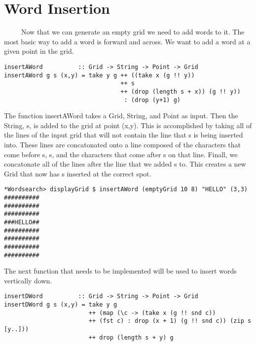 \documentclass[12pt]{report}   %
\begin{document}
\section*{Word Insertion}
    \ \ \ \ \ Now that we can generate an empty grid we need to add words to
    it. The most basic way to add a word is forward and across. We want to add
    a word at a given point in the grid.

    \vspace{12pt}

    \begin{lstlisting}
insertAWord          :: Grid -> String -> Point -> Grid
insertAWord g s (x,y) = take y g ++ ((take x (g !! y)) 
                                 ++ s 
                                 ++ (drop (length s + x)) (g !! y)) 
                                  : (drop (y+1) g)
    \end{lstlisting}

    \vspace{12pt}

    The function insertAWord takes a Grid, String, and Point as input. Then the
    String, s, is added to the grid at point (x,y). This is accomplished by
    taking all of the lines of the input grid that will not contain the line
    that s is being inserted into. These lines are concatonated onto a line
    composed of the characters that come before s, s, and the characters that
    come after s on that line. Finall, we concatonate all of the lines after
    the line that we added s to. This creates a new Grid that now has s
    inserted at the correct spot.

    \vspace{12pt}

\begin{lstlisting}
*Wordsearch> displayGrid $ insertAWord (emptyGrid 10 8) "HELLO" (3,3)
##########
##########
##########
###HELLO##
##########
##########
##########
##########
    \end{lstlisting}

    \vspace{12pt}

    The next function that needs to be implemented will be used to insert words
    vertically down.

    \vspace{12pt}
    \pagebreak

    \begin{lstlisting}
insertDWord          :: Grid -> String -> Point -> Grid
insertDWord g s (x,y) = take y g 
                        ++ (map (\c -> (take x (g !! snd c)) 
                        ++ (fst c) : drop (x + 1) (g !! snd c)) (zip s [y..])) 
                        ++ drop (length s + y) g
    \end{lstlisting}
\end{document}
